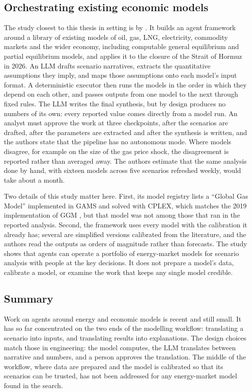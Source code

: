 \subsection{Orchestrating existing economic models}

The study closest to this thesis in setting is by \citet{golden2026agentic}.
It builds an agent framework around a library of existing models of oil, gas, LNG, electricity, commodity markets and the wider economy, including computable general equilibrium and partial equilibrium models, and applies it to the closure of the Strait of Hormuz in 2026.
An LLM drafts scenario narratives, extracts the quantitative assumptions they imply, and maps those assumptions onto each model's input format.
A deterministic executor then runs the models in the order in which they depend on each other, and passes outputs from one model to the next through fixed rules.
The LLM writes the final synthesis, but by design produces no numbers of its own: every reported value comes directly from a model run.
An analyst must approve the work at three checkpoints, after the scenarios are drafted, after the parameters are extracted and after the synthesis is written, and the authors state that the pipeline has no autonomous mode.
Where models disagree, for example on the size of the gas price shock, the disagreement is reported rather than averaged away.
The authors estimate that the same analysis done by hand, with sixteen models across five scenarios refreshed weekly, would take about a month.

Two details of this study matter here.
First, its model registry lists a ``Global Gas Model'' implemented in GAMS and solved with CPLEX, which matches the 2019 implementation of GGM \citep[p.~37]{egging2019global}, but that model was not among those that ran in the reported analysis.
Second, the framework uses every model with the calibration it already has; several are simplified versions calibrated from the literature, and the authors read the outputs as orders of magnitude rather than forecasts.
The study shows that agents can operate a portfolio of energy-market models for scenario analysis with people at the key decisions.
It does not prepare a model's data, calibrate a model, or examine the work that keeps any single model credible.


\subsection{Summary}

Work on agents around energy and economic models is recent and still small.
It has so far concentrated on the two ends of the modelling workflow: translating a scenario into inputs, and translating results into explanations.
The design choices match those in engineering: the model computes, the LLM translates between narrative and numbers, and a person approves the translation.
The middle of the workflow, where data are prepared and the model is calibrated so that its scenarios can be trusted, has not been addressed for any energy-market model found in the search.
